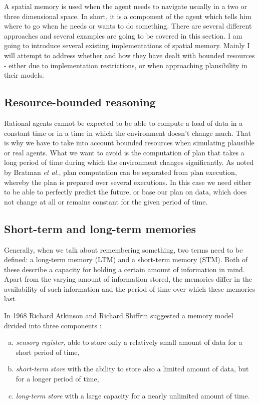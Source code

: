 A spatial memory is used when the agent needs to navigate usually in a two or three dimensional space. In short, it is a component of the agent which tells him where to go when he needs or wants to do something. There are several different approaches and several examples are going to be covered in this section. I am going to introduce several existing implementations of spatial memory. Mainly I will attempt to address whether and how they have dealt with bounded resources - either due to implementation restrictions, or when approaching plausibility in their models.

\subsection{Resource-bounded reasoning}

Rational agents cannot be expected to be able to compute a load of data in a constant time or in a time in which the environment doesn't change much. That is why we have to take into account bounded resources when simulating plausible or real agents. What we want to avoid is the computation of plan that takes a long period of time during which the environment changes significantly. As noted by Bratman \textit{et al.}, plan computation can be separated from plan execution, whereby the plan is prepared over several executions. \cite{Bratman:practicalreasoning} In this case we need either to be able to perfectly predict the future, or base our plan on data, which does not change at all or remains constant for the given period of time.

\subsection{Short-term and long-term memories}

Generally, when we talk about remembering something, two terms need to be defined: a long-term memory (LTM) and a short-term memory (STM). Both of these describe a capacity for holding a certain amount of information in mind. Apart from the varying amount of information stored, the memories differ in the availability of such information and the period of time over which these memories last.      

In 1968 Richard Atkinson and Richard Shiffrin suggested a memory model divided into three components \cite{Atkinson:humanmemory}: 

\begin{enumerate}[(a)]
\item \emph{sensory register}, able to store only a relatively small amount of data for a short period of time,
\item \emph{short-term store} with the ability to store also a limited amount of data, but for a longer period of time,
\item \emph{long-term store} with a large capacity for a nearly unlimited amount of time.
\end{enumerate}

